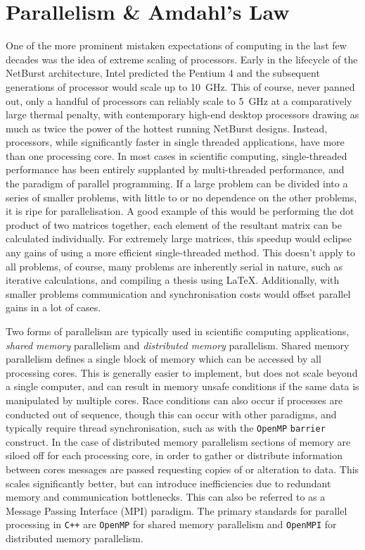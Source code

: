 \section{Parallelism \& Amdahl's Law}
\label{app:parallelism}

One of the more prominent mistaken expectations of computing in the last few decades was the idea of extreme scaling of processors.
Early in the lifecycle of the NetBurst architecture, Intel predicted the Pentium 4 and the subsequent generations of processor would scale up to \SI{10}{\giga\hertz}.
This of course, never panned out, only a handful of processors can reliably scale to \SI{5}{\giga\hertz} at a comparatively large thermal penalty, with contemporary high-end desktop processors drawing as much as twice the power of the hottest running NetBurst designs.
Instead, processors, while significantly faster in single threaded applications, have more than one processing core.
In most cases in scientific computing, single-threaded performance has been entirely supplanted by multi-threaded performance, and the paradigm of parallel programming.
If a large problem can be divided into a series of smaller problems, with little to or no dependence on the other problems, it is ripe for parallelisation.
A good example of this would be performing the dot product of two matrices together, each element of the resultant matrix can be calculated individually.
For extremely large matrices, this speedup would eclipse any gains of using a more efficient single-threaded method.
This doesn't apply to all problems, of course, many problems are inherently serial in nature, such as iterative calculations, and compiling a thesis using \LaTeX.
Additionally, with smaller problems communication and synchronisation costs would offset parallel gains in a lot of cases.

Two forms of parallelism are typically used in scientific computing applications, \emph{shared memory} parallelism and \emph{distributed memory} parallelism.
Shared memory parallelism defines a single block of memory which can be accessed by all processing cores.
This is generally easier to implement, but does not scale beyond a single computer, and can result in memory unsafe conditions if the same data is manipulated by multiple cores.
Race conditions can also occur if processes are conducted out of sequence, though this can occur with other paradigms, and typically require thread synchronisation, such as with the \texttt{OpenMP} \texttt{barrier} construct.
In the case of distributed memory parallelism sections of memory are siloed off for each processing core, in order to gather or distribute information between cores messages are passed requesting copies of or alteration to data.
This scales significantly better, but can introduce inefficiencies due to redundant memory and communication bottlenecks.
This can also be referred to as a Message Passing Interface (MPI) paradigm.
The primary standards for parallel processing in \texttt{C++} are \texttt{OpenMP} for shared memory parallelism and \texttt{OpenMPI} for distributed memory parallelism.

